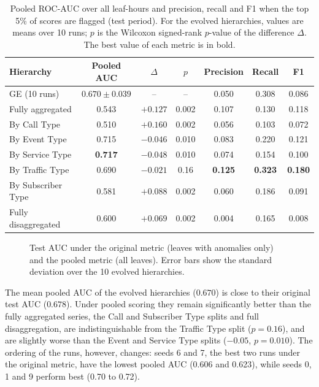 \begin{table}[htbp]
    \centering
    \caption[Pooled ROC-AUC and threshold metrics on the test period]{Pooled \ac{ROC}-\ac{AUC} over all leaf-hours and precision, recall and F1 when the top 5\% of scores are flagged (test period). For the evolved hierarchies, values are means over 10 runs; $p$ is the Wilcoxon signed-rank $p$-value of the difference $\Delta$. The best value of each metric is in bold.}
    \label{tab:pooled}
    \begin{tabular}{lcccccc}
        \toprule
        Hierarchy & Pooled AUC & $\Delta$ & $p$ & Precision & Recall & F1 \\
        \midrule
        GE (10 runs) & $0.670 \pm 0.039$ & -- & -- & 0.050 & 0.308 & 0.086 \\
        Fully aggregated & 0.543 & $+0.127$ & 0.002 & 0.107 & 0.130 & 0.118 \\
        By Call Type & 0.510 & $+0.160$ & 0.002 & 0.056 & 0.103 & 0.072 \\
        By Event Type & 0.715 & $-0.046$ & 0.010 & 0.083 & 0.220 & 0.121 \\
        By Service Type & \textbf{0.717} & $-0.048$ & 0.010 & 0.074 & 0.154 & 0.100 \\
        By Traffic Type & 0.690 & $-0.021$ & 0.16 & \textbf{0.125} & \textbf{0.323} & \textbf{0.180} \\
        By Subscriber Type & 0.581 & $+0.088$ & 0.002 & 0.060 & 0.186 & 0.091 \\
        Fully disaggregated & 0.600 & $+0.069$ & 0.002 & 0.004 & 0.165 & 0.008 \\
        \bottomrule
    \end{tabular}
\end{table}

\begin{figure}[htbp]
    \centering
    \caption[Original vs pooled test AUC]{Test \ac{AUC} under the original metric (leaves with anomalies only) and the pooled metric (all leaves). Error bars show the standard deviation over the 10 evolved hierarchies.}
    \label{fig:pooled-original}
\end{figure}

The mean pooled \ac{AUC} of the evolved hierarchies ($0.670$) is close to their original test \ac{AUC} ($0.678$).
Under pooled scoring they remain significantly better than the fully aggregated series, the Call and Subscriber Type splits and full disaggregation, are indistinguishable from the Traffic Type split ($p = 0.16$), and are slightly worse than the Event and Service Type splits ($-0.05$, $p = 0.010$).
The ordering of the runs, however, changes: seeds 6 and 7, the best two runs under the original metric, have the lowest pooled \ac{AUC} (0.606 and 0.623), while seeds 0, 1 and 9 perform best (0.70 to 0.72).

